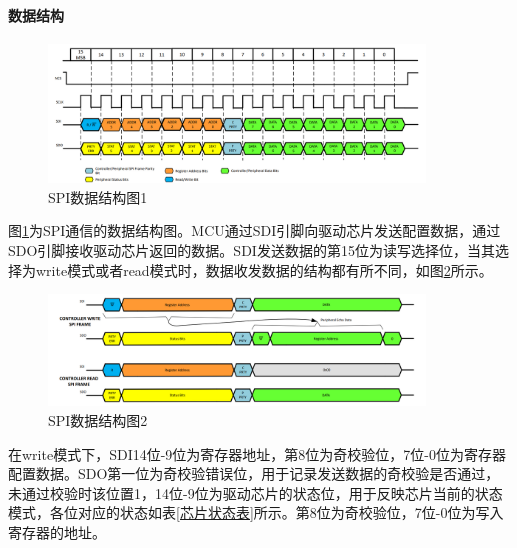 \paragraph{数据结构}

\begin{figure}[!h]
	\centering
	\includegraphics[width=10cm]{figure/SPI Frame.png}
	\caption{SPI数据结构图1}
	\label{SPI数据结构图1}
\end{figure}\par
图\ref{SPI数据结构图1}为SPI通信的数据结构图。MCU通过SDI引脚向驱动芯片发送配置数据，通过SDO引脚接收驱动芯片返回的数据。SDI发送数据的第15位为读写选择位，当其选择为write模式或者read模式时，数据收发数据的结构都有所不同，如图\ref{SPI数据结构图2}所示。
\begin{figure}[!h]
	\centering
	\includegraphics[width=10cm]{figure/SPI Transfer Sequence.png}
	\caption{SPI数据结构图2}
	\label{SPI数据结构图2}
\end{figure}\par

在write模式下，SDI14位-9位为寄存器地址，第8位为奇校验位，7位-0位为寄存器配置数据。SDO第一位为奇校验错误位，用于记录发送数据的奇校验是否通过，未通过校验时该位置1，14位-9位为驱动芯片的状态位，用于反映芯片当前的状态模式，各位对应的状态如表\ref{芯片状态表}所示。第8位为奇校验位，7位-0位为写入寄存器的地址。\par

